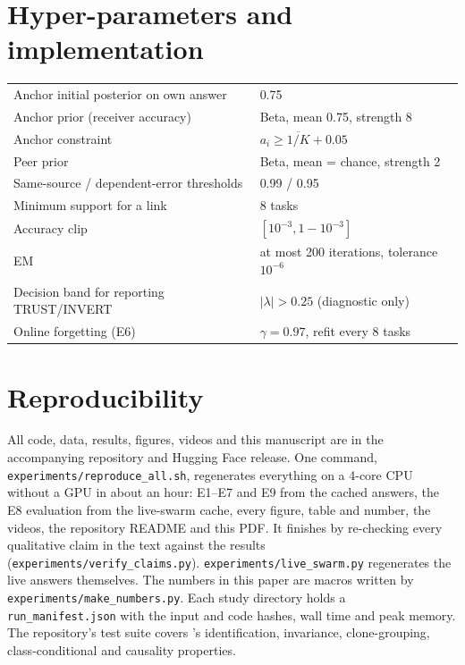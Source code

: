 \section{Hyper-parameters and implementation}\label{app:hparams}
\begin{center}\small
\begin{tabular}{@{}ll@{}}
\toprule
Anchor initial posterior on own answer & 0.75\\
Anchor prior (receiver accuracy) & Beta, mean 0.75, strength 8\\
Anchor constraint & $a_i\ge\overline{1/K}+0.05$\\
Peer prior & Beta, mean = chance, strength 2\\
Same-source / dependent-error thresholds & 0.99 / 0.95\\
Minimum support for a link & 8 tasks\\
Accuracy clip & $[10^{-3},1-10^{-3}]$\\
EM & at most 200 iterations, tolerance $10^{-6}$\\
Decision band for reporting TRUST/INVERT & $|\lambda|>0.25$ (diagnostic only)\\
Online forgetting (E6) & $\gamma=0.97$, refit every 8 tasks\\
\bottomrule
\end{tabular}
\end{center}

\section{Reproducibility}\label{app:repro}
\begin{sloppypar}
All code, data, results, figures, videos and this manuscript are in the accompanying repository and Hugging Face release. One command, \texttt{experiments/\allowbreak reproduce\_all.sh}, regenerates everything on a 4-core CPU without a GPU in about an hour: E1--E7 and E9 from the cached answers, the E8 evaluation from the live-swarm cache, every figure, table and number, the videos, the repository README and this PDF. It finishes by re-checking every qualitative claim in the text against the results (\texttt{experiments/\allowbreak verify\_claims.py}). \texttt{experiments/\allowbreak live\_swarm.py} regenerates the live answers themselves. The numbers in this paper are macros written by \texttt{experiments/\allowbreak make\_numbers.py}. Each study directory holds a \texttt{run\_manifest.json} with the input and code hashes, wall time and peak memory. The repository's test suite covers \race's identification, invariance, clone-grouping, class-conditional and causality properties.
\end{sloppypar}

